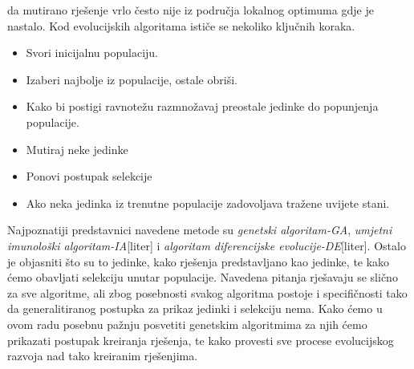 \documentclass[a4paper,twoside,12pt]{memoir} %
\begin{document}
da mutirano rješenje vrlo često nije iz područja lokalnog optimuma gdje je nastalo. Kod evolucijskih algoritama ističe se nekoliko ključnih koraka.
\begin{itemize}
\item Svori inicijalnu populaciju.
\item Izaberi najbolje iz populacije, ostale obriši.
\item Kako bi postigi ravnotežu razmnožavaj preostale jedinke do popunjenja populacije.
\item Mutiraj neke jedinke
\item Ponovi postupak selekcije
\item Ako neka jedinka iz trenutne populacije zadovoljava tražene uvijete stani.
\end{itemize}
Najpoznatiji predstavnici navedene metode su \textit{genetski algoritam-GA}, \textit{umjetni imunološki algoritam-IA}[liter] i \textit{algoritam diferencijske evolucije-DE}[liter]. Ostalo je objasniti što su to jedinke, kako rješenja predstavljano kao jedinke, te kako ćemo obavljati selekciju unutar populacije. Navedena pitanja rješavaju se slično za sve algoritme, ali zbog posebnosti svakog algoritma postoje i specifičnosti tako da generalitiranog postupka za prikaz jedinki i selekciju nema. Kako ćemo u ovom radu posebnu pažnju posvetiti genetskim algoritmima za njih ćemo prikazati postupak kreiranja rješenja, te kako provesti sve procese evolucijskog razvoja nad tako kreiranim rješenjima.
\end{document}
